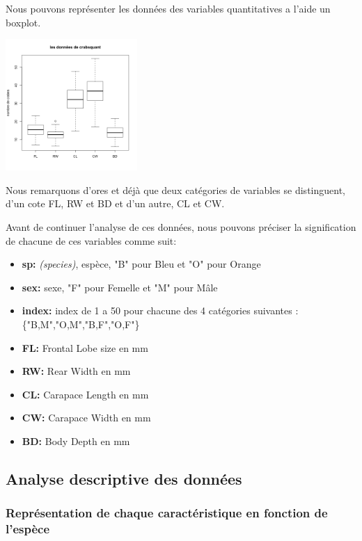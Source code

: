 \documentclass[10pt]{article}
\begin{document}
	Nous pouvons représenter les données des variables quantitatives a l'aide un boxplot.
	\begin{center}
		\includegraphics[width=50mm]{Figures/Crabs/bxp_crabsquant.png}
		\label{fig:boxplot_crabs_quantitatives}
	\end{center}
	
	Nous remarquons d'ores et déjà que deux catégories de variables se distinguent, d'un cote FL, RW et BD et d'un autre, CL et CW.
	
	Avant de continuer l'analyse de ces données, nous pouvons préciser la signification de chacune de ces variables comme suit:
	\begin{itemize}
		\item \textbf{sp:} \textit{(species)}, espèce, "B" pour Bleu et "O" pour Orange
		\item \textbf{sex:} sexe, "F" pour Femelle et "M" pour Mâle
		\item \textbf{index:} index de 1 a 50 pour chacune des 4 catégories suivantes : \{"B,M","O,M","B,F","O,F"\}
		\item \textbf{FL:} Frontal Lobe size en mm
		\item \textbf{RW:} Rear Width en mm
		\item \textbf{CL:} Carapace Length en mm
		\item \textbf{CW:} Carapace Width en mm 
		\item \textbf{BD:} Body Depth en mm
	\end{itemize}
	
	\subsection{Analyse descriptive des données}
	
	\subsubsection{Représentation de chaque caractéristique en fonction de l'espèce}
	
\end{document}
